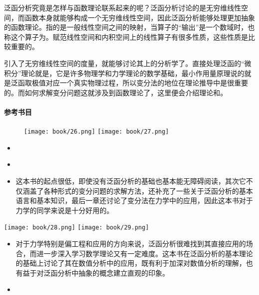 泛函分析究竟是怎样与函数理论联系起来的呢？泛函分析讨论的是无穷维线性空间，而函数本身就能够构成一个无穷维线性空间，因此泛函分析能够处理更加抽象的函数理论。指的是一般线性空间之间的映射，当算子的“输出”是一个数域时，也称这个算子为。赋范线性空间和内积空间上的线性算子有很多性质，这些性质是比较重要的。

引入了无穷维线性空间的度量，就能够讨论其上的分析学了。直接处理泛函的“微积分”理论就是，它是许多物理学和力学理论的数学基础，最小作用量原理说的就是泛函取极值对应一个真实物理过程，所以变分法的地位在理论推导中是很重要的。而如何求解变分问题这就涉及到函数理论了，这里便会介绍理论和。

\paragraph{参考书目}

\begin{figure}[ht]
    \centering
    \texttt{[image: book/26.png]} \quad
    \texttt{[image: book/27.png]}
\end{figure}

\begin{itemize}
    \item \textcite[应用泛函分析]{薛小平2012应用泛函分析}
    \item \textcite[应用泛函分析]{柳重堪1986}     %
    \item \textcite[变分法基础]{老大中2015变分法基础}

          这本书的起点很低，即使没有泛函分析的基础也基本能无障碍阅读，其次它不仅涵盖了各种形式的变分问题的求解方法，还补充了一些关于泛函分析的基本语言和基本知识，最后一章还讨论了变分法在力学中的应用，因此这本书对于力学的同学来说是十分好用的。
\end{itemize}
\begin{center}
    \texttt{[image: book/28.png]} \quad
    \texttt{[image: book/29.png]}
\end{center}

\begin{itemize}
    \item \textcite[数值泛函及其应用]{张维强2021}

          对于力学特别是偏工程和应用的方向来说，泛函分析很难找到其直接应用的场合，而进一步深入学习数学理论又有一定难度。这本书在泛函分析的基本理论的基础上讨论了其在数值分析中的应用，既有利于加深对数值分析的理解，也有益于对泛函分析中抽象的概念建立直观的印象。

    \item \textcite[有限元方法的数学理论]{杜其奎2012}
\end{itemize}

